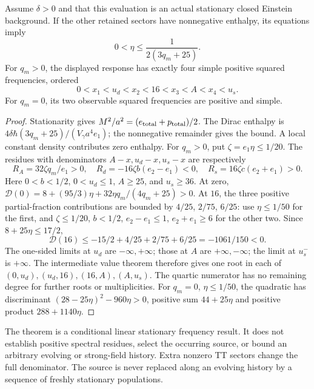 \documentclass[12pt,a4paper]{article}
\begin{document}
\begin{theorem}
\label{p8:thm:stationary-first-tt-positive-poles}
Assume $\delta>0$ and that this evaluation is an actual stationary closed
Einstein background. If the other retained sectors have nonnegative
enthalpy, its equations imply
\[
 0<\eta\le\frac1{2(3q_m+25)}.
\]
For $q_m>0$, the displayed response has exactly four simple positive
squared frequencies, ordered
\[
 0<x_1<u_d<x_2<16<x_3<A<x_4<u_s.
\]
For $q_m=0$, its two observable squared frequencies are positive and simple.
\end{theorem}
\begin{proof}
Stationarity gives $M^2/a^2=(e_{\rm total}+p_{\rm total})/2$.
The Dirac enthalpy is
$4\delta\hbar(3q_m+25)/(V_\gamma a^4e_1)$; the nonnegative remainder
gives the bound. A local constant density contributes zero enthalpy.
For $q_m>0$, put $\zeta=e_1\eta\le1/20$.
The residues with denominators $A-x,u_d-x,u_s-x$ are respectively
\[
 R_A=32\zeta q_m/e_1>0,\quad
 R_d=-16\zeta b(e_2-e_1)<0,\quad
 R_s=16\zeta c(e_2+e_1)>0.
\]
Here $0<b<1/2$, $0<u_d\le1$, $A\ge25$, and $u_s\ge36$.
At zero, $\mathcal D(0)=8+(95/3)\eta+32\eta q_m/(4q_m+25)>0$.
At $16$, the three positive partial-fraction contributions are bounded
by $4/25$, $2/75$, $6/25$: use $\eta\le1/50$ for the first, and
$\zeta\le1/20$, $b<1/2$, $e_2-e_1\le1$, $e_2+e_1\ge6$ for the other
two. Since $8+25\eta\le17/2$,
\[
 \mathcal D(16)\le-15/2+4/25+2/75+6/25=-1061/150<0.
\]
The one-sided limits at $u_d$ are $-\infty,+\infty$; those at $A$ are
$+\infty,-\infty$; the limit at $u_s^-$ is $+\infty$.
The intermediate value theorem therefore gives one root in each of
$(0,u_d),(u_d,16),(16,A),(A,u_s)$. The quartic numerator has no remaining
degree for further roots or multiplicities. For $q_m=0$, $\eta\le1/50$,
the quadratic has discriminant $(28-25\eta)^2-960\eta>0$, positive sum
$44+25\eta$ and positive product $288+1140\eta$.
\end{proof}
The theorem is a conditional linear stationary frequency result. It does
not establish positive spectral residues, select the occurring source,
or bound an arbitrary evolving or strong-field history. Extra nonzero TT
sectors change the full denominator. The source is never replaced along
an evolving history by a sequence of freshly stationary populations.




\end{document}
